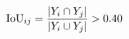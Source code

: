 \documentclass[preview]{standalone}
\begin{document}
\begin{align*}
\special{dvisvgm:raw <g id='unique000'>}\text{IoU}_{ij} = \frac{|Y_i \cap Y_j|}{|Y_i \cup Y_j|} > 0.40\special{dvisvgm:raw </g>}
\end{align*}
\end{document}
